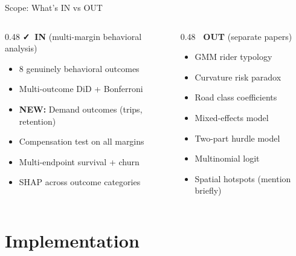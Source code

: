 \documentclass[aspectratio=169, 11pt]{beamer}
\begin{document}
\begin{frame}{Scope: What's IN vs OUT}
\small
\begin{columns}[T]
\begin{column}{0.48\textwidth}
\textbf{\color{AccentGreen}\faCheck~IN} {\footnotesize(multi-margin behavioral analysis)}
\begin{itemize}
\item 8 genuinely behavioral outcomes
\item Multi-outcome DiD + Bonferroni
\item \textbf{NEW:} Demand outcomes (trips, retention)
\item Compensation test on all margins
\item Multi-endpoint survival + churn
\item SHAP across outcome categories
\end{itemize}
\end{column}
\begin{column}{0.48\textwidth}
\textbf{\color{PhaseRed}\faTimes~OUT} {\footnotesize(separate papers)}
\begin{itemize}
\item GMM rider typology
\item Curvature risk paradox
\item Road class coefficients
\item Mixed-effects model
\item Two-part hurdle model
\item Multinomial logit
\item Spatial hotspots (mention briefly)
\end{itemize}
\end{column}
\end{columns}
\end{frame}

\section{Implementation}
\end{document}
